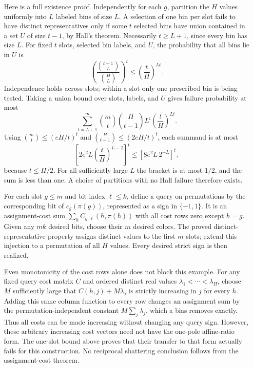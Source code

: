 \documentclass[11pt]{article}
\begin{document}
Here is a full existence proof. Independently for each $g$, partition
the $H$ values uniformly into $L$ labeled bins of size $L$.
A selection of one bin per slot fails to have distinct representatives
only if some $t$ selected bins have union contained in a set $U$ of
size $t-1$, by Hall's theorem. Necessarily $t\ge L+1$, since every
bin has size $L$. For fixed $t$ slots, selected bin labels, and $U$,
the probability that all bins lie in $U$ is
\[
 \left(\frac{\binom{t-1}{L}}{\binom HL}\right)^t
 \le\left(\frac tH\right)^{Lt}.
\]
Independence holds across slots; within a slot only one prescribed bin
is being tested. Taking a union bound over slots, labels, and $U$
gives failure probability at most
\[
 \sum_{t=L+1}^{m}\binom mt\binom H{t-1}L^t
                  \left(\frac tH\right)^{Lt}.
\]
Using $\binom mt\le(eH/t)^t$ and
$\binom H{t-1}\le(2eH/t)^t$, each summand is at most
\[
 \left[2e^2L\left(\frac tH\right)^{L-2}\right]^t
 \le\left[8e^2L\,2^{-L}\right]^t,
\]
because $t\le H/2$. For all sufficiently large $L$ the bracket is
at most $1/2$, and the sum is less than one. A choice of partitions
with no Hall failure therefore exists.

For each slot $g\le m$ and bit index $\ell\le k$, define a query
on permutations by the corresponding bit of $c_g(\pi(g))$, represented
as a sign in $\{-1,1\}$. It is an assignment-cost sum
$\sum_h C_{g,\ell}(h,\pi(h))$ with all cost rows zero except $h=g$.
Given any $mk$ desired bits, choose their $m$ desired colors. The
proved distinct-representative property assigns distinct values to
the first $m$ slots; extend this injection to a permutation of all
$H$ values. Every desired strict sign is then realized.

Even monotonicity of the cost rows alone does not block this example.
For any fixed query cost matrix $C$ and ordered distinct real values
$\lambda_1<\cdots<\lambda_H$, choose $M$ sufficiently large that
$C(h,j)+M\lambda_j$ is strictly increasing in $j$ for every $h$.
Adding this same column function to every row changes an assignment
sum by the permutation-independent constant $M\sum_j\lambda_j$,
which a bias removes exactly. Thus all costs can be made increasing
without changing any query sign. However, these arbitrary increasing
cost vectors need not have the one-pole affine-ratio form. The
one-slot bound above proves that their transfer to that form actually
fails for this construction. No reciprocal shattering conclusion
follows from the assignment-cost theorem.
\end{document}

